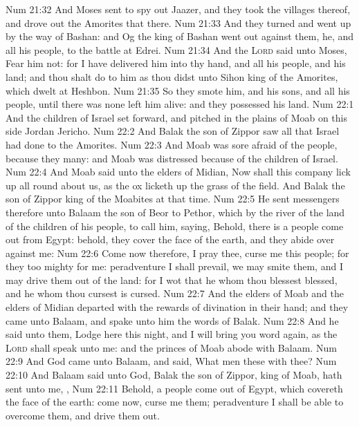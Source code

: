 \vs Num 21:32 And Moses sent to spy out Jaazer, and they took the villages thereof, and drove out the Amorites that  there.
\vs Num 21:33 And they turned and went up by the way of Bashan: and Og the king of Bashan went out against them, he, and all his people, to the battle at Edrei.
\vs Num 21:34 And the \textsc{Lord} said unto Moses, Fear him not: for I have delivered him into thy hand, and all his people, and his land; and thou shalt do to him as thou didst unto Sihon king of the Amorites, which dwelt at Heshbon.
\vs Num 21:35 So they smote him, and his sons, and all his people, until there was none left him alive: and they possessed his land.
\vs Num 22:1 And the children of Israel set forward, and pitched in the plains of Moab on this side Jordan  Jericho.
\vs Num 22:2 And Balak the son of Zippor saw all that Israel had done to the Amorites.
\vs Num 22:3 And Moab was sore afraid of the people, because they  many: and Moab was distressed because of the children of Israel.
\vs Num 22:4 And Moab said unto the elders of Midian, Now shall this company lick up all  round about us, as the ox licketh up the grass of the field. And Balak the son of Zippor  king of the Moabites at that time.
\vs Num 22:5 He sent messengers therefore unto Balaam the son of Beor to Pethor, which  by the river of the land of the children of his people, to call him, saying, Behold, there is a people come out from Egypt: behold, they cover the face of the earth, and they abide over against me:
\vs Num 22:6 Come now therefore, I pray thee, curse me this people; for they  too mighty for me: peradventure I shall prevail,  we may smite them, and  I may drive them out of the land: for I wot that he whom thou blessest  blessed, and he whom thou cursest is cursed.
\vs Num 22:7 And the elders of Moab and the elders of Midian departed with the rewards of divination in their hand; and they came unto Balaam, and spake unto him the words of Balak.
\vs Num 22:8 And he said unto them, Lodge here this night, and I will bring you word again, as the \textsc{Lord} shall speak unto me: and the princes of Moab abode with Balaam.
\vs Num 22:9 And God came unto Balaam, and said, What men  these with thee?
\vs Num 22:10 And Balaam said unto God, Balak the son of Zippor, king of Moab, hath sent unto me, ,
\vs Num 22:11 Behold,  a people come out of Egypt, which covereth the face of the earth: come now, curse me them; peradventure I shall be able to overcome them, and drive them out.
